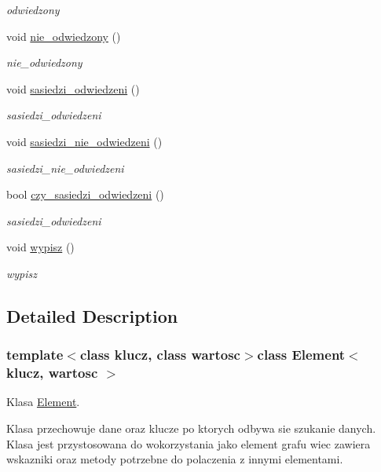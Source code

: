 \begin{DoxyCompactItemize}
\begin{DoxyCompactList}\small\item\em odwiedzony \end{DoxyCompactList}\item 
void \hyperlink{class_element_a1091b5a9763464470901903c27fa3af4}{nie\+\_\+odwiedzony} ()
\begin{DoxyCompactList}\small\item\em nie\+\_\+odwiedzony \end{DoxyCompactList}\item 
void \hyperlink{class_element_aea8ebe54afa2525740e1b065f9fd3a13}{sasiedzi\+\_\+odwiedzeni} ()
\begin{DoxyCompactList}\small\item\em sasiedzi\+\_\+odwiedzeni \end{DoxyCompactList}\item 
void \hyperlink{class_element_a04d9f1bebfc82dad1ca3e32e1f84fd5d}{sasiedzi\+\_\+nie\+\_\+odwiedzeni} ()
\begin{DoxyCompactList}\small\item\em sasiedzi\+\_\+nie\+\_\+odwiedzeni \end{DoxyCompactList}\item 
bool \hyperlink{class_element_a07619a03996d2a7261d78dea30319d7a}{czy\+\_\+sasiedzi\+\_\+odwiedzeni} ()
\begin{DoxyCompactList}\small\item\em sasiedzi\+\_\+odwiedzeni \end{DoxyCompactList}\item 
void \hyperlink{class_element_afd6003b54275449e8b67d34a842a87fc}{wypisz} ()
\begin{DoxyCompactList}\small\item\em wypisz \end{DoxyCompactList}\end{DoxyCompactItemize}


\subsection{Detailed Description}
\subsubsection*{template$<$class klucz, class wartosc$>$class Element$<$ klucz, wartosc $>$}

Klasa \hyperlink{class_element}{Element}. 

Klasa przechowuje dane oraz klucze po ktorych odbywa sie szukanie danych. Klasa jest przystosowana do wokorzystania jako element grafu wiec zawiera wskazniki oraz metody potrzebne do polaczenia z innymi elementami. 

